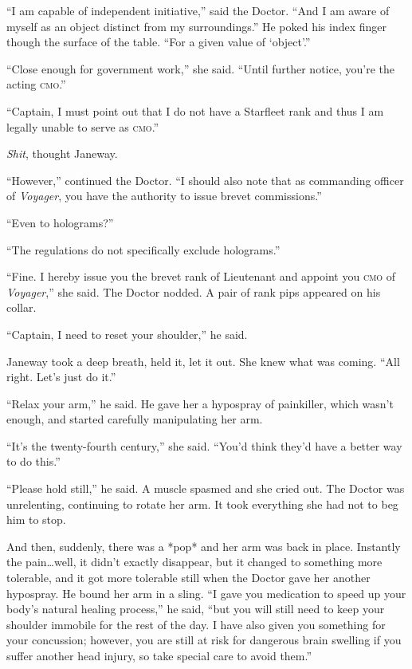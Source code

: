\documentclass[twoside,letterpaper,12pt]{memoir}
\begin{document}
``I am capable of independent initiative,'' said the Doctor. ``And I am aware of myself as an object distinct from my surroundings.'' He poked his index finger though the surface of the table. ``For a given value of `object'.''

``Close enough for government work,'' she said. ``Until further notice, you're the acting \textsc{cmo}.''

``Captain, I must point out that I do not have a Starfleet rank and thus I am legally unable to serve as \textsc{cmo}.''

\textit{Shit}, thought Janeway.

``However,'' continued the Doctor. ``I should also note that as commanding officer of \textit{Voyager}, you have the authority to issue brevet commissions.''

``Even to holograms?''

``The regulations do not specifically exclude holograms.''

``Fine. I hereby issue you the brevet rank of Lieutenant and appoint you \textsc{cmo} of \textit{Voyager},'' she said. The Doctor nodded. A pair of rank pips appeared on his collar.

``Captain, I need to reset your shoulder,'' he said.

Janeway took a deep breath, held it, let it out. She knew what was coming. ``All right. Let's just do it.''

``Relax your arm,'' he said. He gave her a hypospray of painkiller, which wasn't enough, and started carefully manipulating her arm.

``It's the twenty-fourth century,'' she said. ``You'd think they'd have a better way to do this.''

``Please hold still,'' he said. A muscle spasmed and she cried out. The Doctor was unrelenting, continuing to rotate her arm. It took everything she had not to beg him to stop.

And then, suddenly, there was a *pop* and her arm was back in place. Instantly the pain\ldots well, it didn't exactly disappear, but it changed to something more tolerable, and it got more tolerable still when the Doctor gave her another hypospray. He bound her arm in a sling. ``I gave you medication to speed up your body's natural healing process,'' he said, ``but you will still need to keep your shoulder immobile for the rest of the day. I have also given you something for your concussion; however, you are still at risk for dangerous brain swelling if you suffer another head injury, so take special care to avoid them.''
\end{document}
